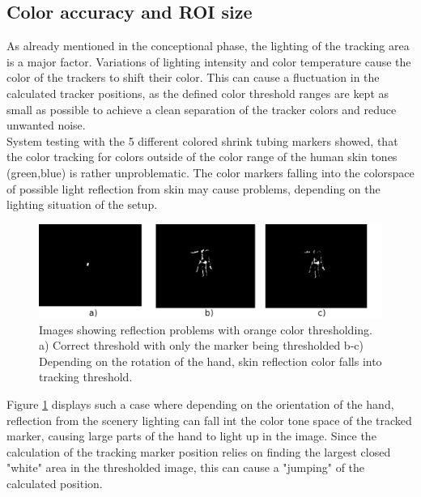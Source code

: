 \subsection{Color accuracy and ROI size}
As already mentioned in the conceptional phase, the lighting of the tracking area is a major factor. Variations of lighting intensity and color temperature cause the color of the trackers to shift their color. This can cause a fluctuation in the calculated tracker positions, as the defined color threshold ranges are kept as small as possible to achieve a clean separation of the tracker colors and reduce unwanted noise. \\
System testing with the 5 different colored shrink tubing markers showed, that the color tracking for colors outside of the color range of the human skin tones (green,blue) is rather unproblematic. The color markers falling into the colorspace of possible light reflection from skin may cause problems, depending on the lighting situation of the setup.
\begin{figure}[H]
\includegraphics[width=\textwidth]{images/color_tracking_probs.png}
\caption{Images showing reflection problems with  orange color thresholding. a) Correct threshold with only the marker being thresholded b-c) Depending on the rotation of the hand, skin reflection color falls into tracking threshold.}
\label{img:Color_reflecton_problems} 
\end{figure}
Figure \ref{img:Color_reflecton_problems} displays such a case where depending on the orientation of the hand, reflection from the scenery lighting can fall int the color tone space of the tracked marker, causing large parts of the hand to light up in the image. Since the calculation of the tracking marker position relies on finding the largest closed "white" area in the thresholded image, this can cause a "jumping" of the calculated position. 
